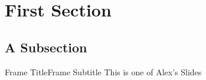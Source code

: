 \section{First Section}

\subsection{A Subsection}
	\begin{frame}{Frame Title}{Frame Subtitle}
		This is one of Alex's Slides

	\end{frame}